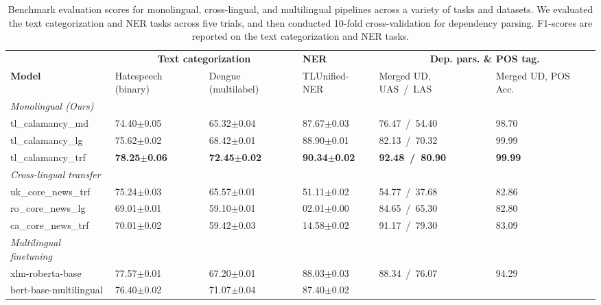 \documentclass[../emnlp2023.tex]{subfiles}
\begin{document}
\begin{table*}[t]
\begin{tabular}{@{}p{4cm}p{2cm}p{2cm}p{2cm}p{2cm}p{2cm}@{}}
\toprule
                           & \multicolumn{2}{c}{\textbf{Text categorization}} & \textbf{NER} & \multicolumn{2}{c}{\textbf{Dep. pars. \& POS tag.}}                         \\ 
\textbf{Model}             & Hatespeech (binary) & Dengue (multilabel) & TLUnified-NER & Merged UD, UAS~/~LAS & Merged UD, POS Acc. \\ \midrule 
\textit{Monolingual (Ours)}              \\
tl\_calamancy\_md          & 74.40$\pm$0.05 & 65.32$\pm$0.04 & 87.67$\pm$0.03 & 76.47~/~54.40 & 98.70\\
tl\_calamancy\_lg          & 75.62$\pm$0.02 & 68.42$\pm$0.01 & 88.90$\pm$0.01 & 82.13~/~70.32 & 99.99\\
tl\_calamancy\_trf         & \textbf{78.25$\pm$0.06} & \textbf{72.45$\pm$0.02} & \textbf{90.34$\pm$0.02} & \textbf{92.48~/~80.90} & \textbf{99.99} \\ \midrule
\textit{Cross-lingual transfer} \\
uk\_core\_news\_trf        & 75.24$\pm$0.03 & 65.57$\pm$0.01 & 51.11$\pm$0.02 & 54.77~/~37.68 & 82.86 \\
ro\_core\_news\_lg         & 69.01$\pm$0.01 & 59.10$\pm$0.01 & 02.01$\pm$0.00 & 84.65~/~65.30 & 82.80 \\
ca\_core\_news\_trf        & 70.01$\pm$0.02 & 59.42$\pm$0.03 & 14.58$\pm$0.02 & 91.17~/~79.30 & 83.09 \\ \midrule
\textit{Multilingual finetuning} \\
xlm-roberta-base          & 77.57$\pm$0.01 & 67.20$\pm$0.01 & 88.03$\pm$0.03 & 88.34~/~76.07 & 94.29 \\
bert-base-multilingual    & 76.40$\pm$0.02 & 71.07$\pm$0.04 & 87.40$\pm$0.02\\
\bottomrule
\end{tabular}
\caption{
    Benchmark evaluation scores for monolingual, cross-lingual, and multilingual pipelines across a variety of tasks and datasets.
    We evaluated the text categorization and NER tasks across five trials, and then conducted 10-fold cross-validation for dependency parsing.
    F1-scores are reported on the text categorization and NER tasks.
}
\label{table:results}
\end{table*}
\end{document}
